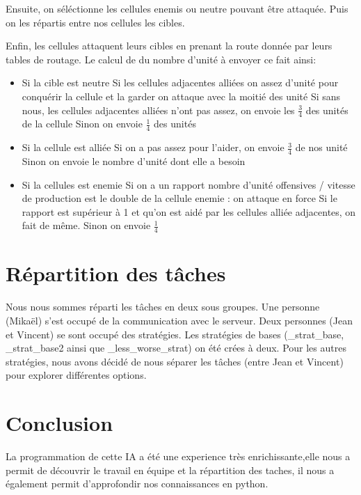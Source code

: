 \documentclass{rapport}
\begin{document}
			Ensuite, on séléctionne les cellules enemis ou neutre pouvant être attaquée. Puis on les répartis entre nos cellules les cibles.

			Enfin, les cellules attaquent leurs cibles en prenant la route donnée par leurs tables de routage.
			Le calcul de du nombre d'unité à envoyer ce fait ainsi:
			\begin{itemize}
					\item Si la cible est neutre
						\subitem Si les cellules adjacentes alliées on assez d'unité pour conquérir la cellule et la garder on attaque avec la moitié des unité
						\subitem Si sans nous, les cellules adjacentes alliées n'ont pas assez, on envoie les $\frac{3}{4}$ des unités de la cellule
						\subitem Sinon on envoie $\frac{1}{4}$ des unités
					\item Si la cellule est alliée
						\subitem Si on a pas assez pour l'aider, on envoie $\frac{3}{4}$ de nos unité
						\subitem Sinon on envoie le nombre d'unité dont elle a besoin
					\item Si la cellules est enemie
						\subitem Si on a un rapport nombre d'unité offensives / vitesse de production est le double de la cellule enemie : on attaque en force
						\subitem Si le rapport est supérieur à 1 et qu'on est aidé par les cellules alliée adjacentes, on fait de même.
						\subitem Sinon on envoie $\frac{1}{4}$
			\end{itemize}
	\chapter{Répartition des tâches}
		Nous nous sommes réparti les tâches en deux sous groupes. Une personne (Mikaël) s'est occupé de la communication
		avec le serveur. Deux personnes (Jean et Vincent) se sont occupé des stratégies. Les stratégies de bases (\_strat\_base, \_strat\_base2 ainsi que \_less\_worse\_strat) on été crées à deux. Pour les autres stratégies, nous avons décidé de nous séparer les tâches (entre Jean et Vincent) pour explorer différentes options.
	\chapter*{Conclusion}
La programmation de cette IA a été une experience très enrichissante,elle nous a permit de découvrir le travail en équipe et la répartition des taches, 
il nous a également permit d'approfondir nos connaissances en python.
	\printindex
\end{document}
